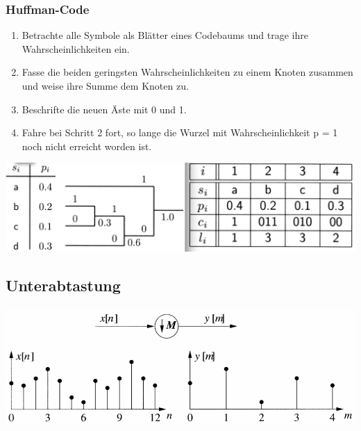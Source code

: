 \documentclass[10pt]{article}
\begin{document}
\subsubsection{Huffman-Code}
\begin{enumerate}
	\item Betrachte alle Symbole als Blätter eines Codebaums und trage ihre Wahrscheinlichkeiten ein.
	\item Fasse die beiden geringsten Wahrscheinlichkeiten zu einem Knoten zusammen und weise ihre Summe dem Knoten zu.
	\item Beschrifte die neuen Äste mit 0 und 1.
	\item Fahre bei Schritt 2 fort, so lange die Wurzel mit Wahrscheinlichkeit p = 1 noch nicht erreicht worden ist.
\end{enumerate}
\begin{center}
	\includegraphics[scale=0.2]{huffman-code.png}
\end{center}

\subsection{Unterabtastung}
\begin{center}
	\includegraphics[scale=0.3]{unterabtastung.png}
\end{center}
\end{document}
